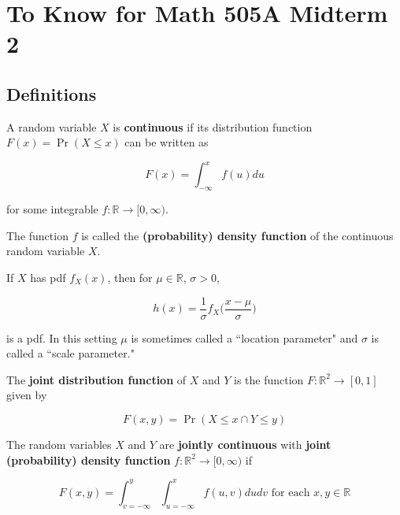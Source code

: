 \section{To Know for Math 505A Midterm 2}

\subsection{Definitions}

\begin{definition} A random variable \(X\) is \textbf{continuous} if its distribution function \(F(x) = \Pr(X \leq x)\) can be written as 

\[
F(x) = \int_{-\infty}^x f(u) du
\]

for some integrable \(f: \mathbb{R} \to [0, \infty)\). 
\end{definition}

\begin{definition} The function \(f\) is called the \textbf{(probability) density function} of the continuous random variable \(X\). \end{definition} 

\begin{proposition} If \(X\) has pdf \(f_X(x)\), then for \(\mu \in \mathbb{R}\), \(\sigma > 0\),

\[
h(x) = \frac{1}{\sigma} f_X \bigg( \frac{x - \mu}{\sigma} \bigg)
\]

is a pdf. In this setting \(\mu\) is sometimes called a ``location parameter" and \(\sigma\) is called a ``scale parameter."

\end{proposition} 

\begin{definition} The \textbf{joint distribution function} of \(X\) and \(Y\) is the function \(F: \mathbb{R}^2 \to [0, 1]\) given by

\[
F(x, y) = \Pr(X \leq x \cap Y \leq y)
\]

\end{definition}

\begin{definition}

The random variables \(X\) and \(Y\) are \textbf{jointly continuous} with \textbf{joint (probability) density function} \(f: \mathbb{R}^2 \to [0, \infty)\) if

\[
F(x, y) = \int_{v=-\infty}^y \int_{u=-\infty}^x f(u, v) du dv \text{ for each } x, y \in \mathbb{R}
\]

\end{definition}

